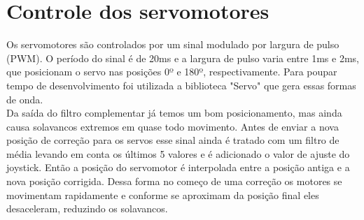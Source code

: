 \pagebreak
\section{Controle dos servomotores}

Os servomotores são controlados por um sinal modulado por largura de pulso (PWM). O período do sinal é de 20ms e a largura de pulso varia entre 1ms e 2ms, que posicionam o servo nas posições 0º e 180º, respectivamente. Para poupar tempo de desenvolvimento foi utilizada a biblioteca "Servo" que gera essas formas de onda.\\
\indent Da saída do filtro complementar já temos um bom posicionamento, mas ainda causa solavancos extremos em quase todo movimento. Antes de enviar a nova posição de correção para os servos esse sinal ainda é tratado com um filtro de média levando em conta os últimos 5 valores e é adicionado o valor de ajuste do joystick. Então a posição do servomotor é interpolada entre a posição antiga e a nova posição corrigida. Dessa forma no começo de uma correção os motores se movimentam rapidamente e conforme se aproximam da posição final eles desaceleram, reduzindo os solavancos.